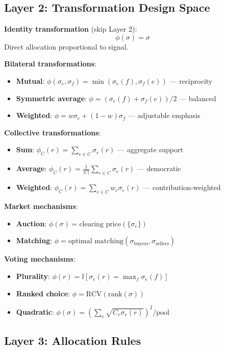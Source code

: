 \documentclass[11pt,a4paper]{article}
\theoremstyle{definition}
\theoremstyle{remark}
\begin{document}
\subsection{Layer 2: Transformation Design Space}

\textbf{Identity transformation} (skip Layer 2):
\[ \phi(\sigma) = \sigma \]
Direct allocation proportional to signal.

\textbf{Bilateral transformations}:
\begin{itemize}
\item \textbf{Mutual}: $\phi(\sigma_e, \sigma_f) = \min(\sigma_e(f), \sigma_f(e))$ --- reciprocity
\item \textbf{Symmetric average}: $\phi = (\sigma_e(f) + \sigma_f(e))/2$ --- balanced
\item \textbf{Weighted}: $\phi = w \sigma_e + (1-w) \sigma_f$ --- adjustable emphasis
\end{itemize}

\textbf{Collective transformations}:
\begin{itemize}
\item \textbf{Sum}: $\phi_C(r) = \sum_{e \in C} \sigma_e(r)$ --- aggregate support
\item \textbf{Average}: $\phi_C(r) = \frac{1}{|C|}\sum_{e \in C} \sigma_e(r)$ --- democratic
\item \textbf{Weighted}: $\phi_C(r) = \sum_{e \in C} w_e \sigma_e(r)$ --- contribution-weighted
\end{itemize}

\textbf{Market mechanisms}:
\begin{itemize}
\item \textbf{Auction}: $\phi(\sigma) = \text{clearing price}(\{\sigma_e\})$
\item \textbf{Matching}: $\phi = \text{optimal matching}(\sigma_{\text{buyers}}, \sigma_{\text{sellers}})$
\end{itemize}

\textbf{Voting mechanisms}:
\begin{itemize}
\item \textbf{Plurality}: $\phi(r) = \mathbb{I}[\sigma_e(r) = \max_f \sigma_e(f)]$
\item \textbf{Ranked choice}: $\phi = \text{RCV}(\text{rank}(\sigma))$
\item \textbf{Quadratic}: $\phi(\sigma) = (\sum_e \sqrt{C_e \sigma_e(r)})^2 / \text{pool}$
\end{itemize}

\subsection{Layer 3: Allocation Rules}
\end{document}

